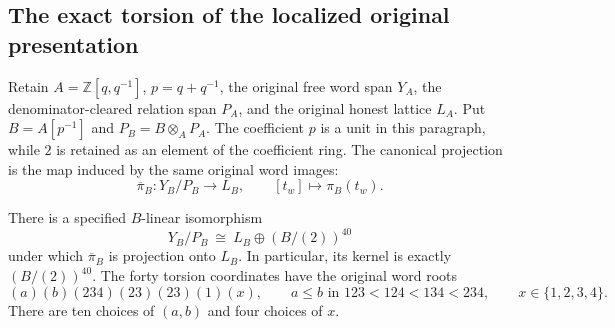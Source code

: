 \subsection{The exact torsion of the localized original presentation}
\label{subsec:full-localized-presentation-torsion}

Retain $A=\mathbb Z[q,q^{-1}]$, $p=q+q^{-1}$, the original
free word span $Y_A$, the denominator-cleared relation span
$P_A$, and the original honest lattice $L_A$. Put
$B=A[p^{-1}]$ and $P_B=B\otimes_A P_A$.
The coefficient $p$ is a unit in this paragraph, while $2$
is retained as an element of the coefficient ring. The
canonical projection is the map induced by the same original
word images:
\[
 \overline\pi_B:Y_B/P_B\longrightarrow L_B,
 \qquad [t_w]\longmapsto\pi_B(t_w).
\]

\begin{proposition}\label{prop:full-localized-torsion}
There is a specified $B$-linear isomorphism
\[
 Y_B/P_B\ \cong\ L_B\oplus(B/(2))^{40}
\]
under which $\overline\pi_B$ is projection onto $L_B$.
In particular, its kernel is exactly $(B/(2))^{40}$.
The forty torsion coordinates have the original word roots
\begin{equation}\label{eq:full-torsion-roots}
 (a)(b)(234)(23)(23)(1)(x),\qquad
 a\leq b\text{ in }123<124<134<234,\qquad
 x\in\{1,2,3,4\}.
\end{equation}
There are ten choices of $(a,b)$ and four choices of $x$.
\end{proposition}

